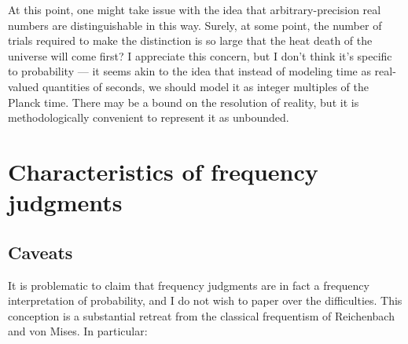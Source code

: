 \documentclass[letterpaper,12pt]{article}
\begin{document}
At this point, one might take issue with the idea that arbitrary-precision real numbers are distinguishable in this way. Surely, at some point, the number of trials required to make the distinction is so large that the heat death of the universe will come first? I appreciate this concern, but I don't think it's specific to probability --- it seems akin to the idea that instead of modeling time as real-valued quantities of seconds, we should model it as integer multiples of the Planck time. There may be a bound on the resolution of reality, but it is methodologically convenient to represent it as unbounded.

\section{Characteristics of frequency judgments}
\label{sec:characteristicsOfJudgments}
\subsection{Caveats}
It is problematic to claim that frequency judgments are in fact a frequency interpretation of probability, and I do not wish to paper over the difficulties. This conception is a substantial retreat from the classical frequentism of Reichenbach and von Mises. In particular:
\end{document}

